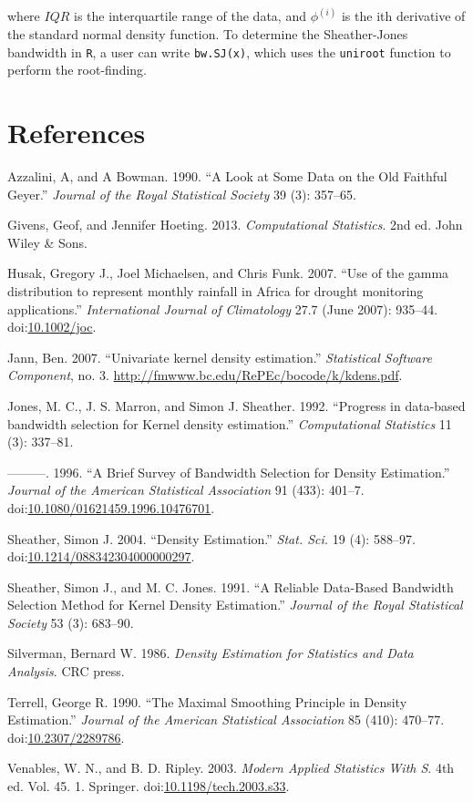 \documentclass[]{article}
\begin{document}
where \(IQR\) is the interquartile range of the data, and \(\phi^{(i)}\)
is the ith derivative of the standard normal density function. To
determine the Sheather-Jones bandwidth in \texttt{R}, a user can write
\texttt{bw.SJ(x)}, which uses the \texttt{uniroot} function to perform
the root-finding.

\section*{References}\label{references}

\hypertarget{refs}{}
\hypertarget{ref-Bowman1990}{}
Azzalini, A, and A Bowman. 1990. ``A Look at Some Data on the Old
Faithful Geyer.'' \emph{Journal of the Royal Statistical Society} 39
(3): 357--65.

\hypertarget{ref-Givens2013}{}
Givens, Geof, and Jennifer Hoeting. 2013. \emph{Computational
Statistics}. 2nd ed. John Wiley \& Sons.

\hypertarget{ref-Husak2007}{}
Husak, Gregory J., Joel Michaelsen, and Chris Funk. 2007. ``Use of the
gamma distribution to represent monthly rainfall in Africa for drought
monitoring applications.'' \emph{International Journal of Climatology}
27.7 (June 2007): 935--44.
doi:\href{https://doi.org/10.1002/joc}{10.1002/joc}.

\hypertarget{ref-Jann2007}{}
Jann, Ben. 2007. ``Univariate kernel density estimation.''
\emph{Statistical Software Component}, no. 3.
\url{http://fmwww.bc.edu/RePEc/bocode/k/kdens.pdf}.

\hypertarget{ref-Jones1992}{}
Jones, M. C., J. S. Marron, and Simon J. Sheather. 1992. ``Progress in
data-based bandwidth selection for Kernel density estimation.''
\emph{Computational Statistics} 11 (3): 337--81.

\hypertarget{ref-Jones1996}{}
---------. 1996. ``A Brief Survey of Bandwidth Selection for Density
Estimation.'' \emph{Journal of the American Statistical Association} 91
(433): 401--7.
doi:\href{https://doi.org/10.1080/01621459.1996.10476701}{10.1080/01621459.1996.10476701}.

\hypertarget{ref-Sheather2004}{}
Sheather, Simon J. 2004. ``Density Estimation.'' \emph{Stat. Sci.} 19
(4): 588--97.
doi:\href{https://doi.org/10.1214/088342304000000297}{10.1214/088342304000000297}.

\hypertarget{ref-Sheather1991}{}
Sheather, Simon J., and M. C. Jones. 1991. ``A Reliable Data-Based
Bandwidth Selection Method for Kernel Density Estimation.''
\emph{Journal of the Royal Statistical Society} 53 (3): 683--90.

\hypertarget{ref-Silverman1986}{}
Silverman, Bernard W. 1986. \emph{Density Estimation for Statistics and
Data Analysis}. CRC press.

\hypertarget{ref-Terrell1990}{}
Terrell, George R. 1990. ``The Maximal Smoothing Principle in Density
Estimation.'' \emph{Journal of the American Statistical Association} 85
(410): 470--77.
doi:\href{https://doi.org/10.2307/2289786}{10.2307/2289786}.

\hypertarget{ref-Venables}{}
Venables, W. N., and B. D. Ripley. 2003. \emph{Modern Applied Statistics
With S}. 4th ed. Vol. 45. 1. Springer.
doi:\href{https://doi.org/10.1198/tech.2003.s33}{10.1198/tech.2003.s33}.
\end{document}
